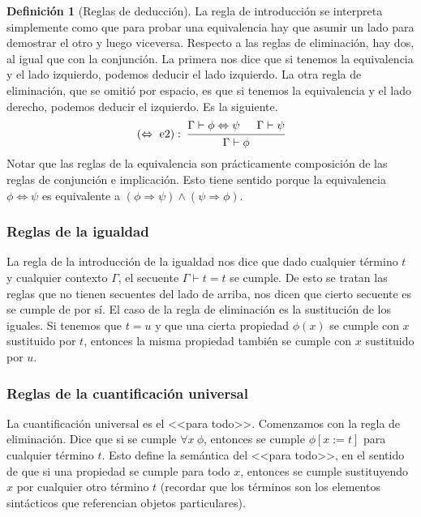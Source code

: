 \documentclass[a4paper, 12pt]{report}
\newcommand{\Ra}{\Rightarrow}
\newcommand{\te}{\text}
\newcommand{\Lra}{\Leftrightarrow}
\theoremstyle{definition}
\newtheorem{definicion}[teorema]{Definición}
\begin{document}
\begin{definicion}[Reglas de deducción]
La regla de introducción se interpreta simplemente como que para probar una equivalencia hay que asumir un lado para demostrar el otro y luego viceversa. Respecto a las reglas de eliminación, hay dos, al igual que con la conjunción. La primera nos dice que si tenemos la equivalencia y el lado izquierdo, podemos deducir el lado izquierdo. La otra regla de eliminación, que se omitió por espacio, es que si tenemos la equivalencia y el lado derecho, podemos deducir el izquierdo. Es la siguiente.
$$(\Lra\te{ e2}):~\begin{prooftree}
	\hypo{\Gamma\vdash\phi\Lra\psi}\hypo{\Gamma\vdash\psi}
	\infer2{\Gamma\vdash\phi}\end{prooftree}
$$
Notar que las reglas de la equivalencia son prácticamente composición de las reglas de conjunción e implicación. Esto tiene sentido porque la equivalencia $\phi\Lra\psi$ es equivalente a $(\phi\Ra\psi)\wedge(\psi\Ra\phi)$.

\subsubsection{Reglas de la igualdad}

La regla de la introducción de la igualdad nos dice que dado cualquier término $t$ y cualquier contexto $\Gamma$, el secuente $\Gamma\vdash t=t$ se cumple. De esto se tratan las reglas que no tienen secuentes del lado de arriba, nos dicen que cierto secuente es se cumple de por sí. El caso de la regla de eliminación es la sustitución de los iguales. Si tenemos que $t=u$ y que una cierta propiedad $\phi(x)$ se cumple con $x$ sustituido por $t$, entonces la misma propiedad también se cumple con $x$ sustituido por $u$.

\subsubsection{Reglas de la cuantificación universal}

La cuantificación universal es el <<para todo>>. Comenzamos con la regla de eliminación. Dice que si se cumple $\forall x~\phi$, entonces se cumple $\phi[x:=t]$ para cualquier término $t$. Esto define la semántica del <<para todo>>, en el sentido de que si una propiedad se cumple para todo $x$, entonces se cumple sustituyendo $x$ por cualquier otro término $t$ (recordar que los términos son los elementos sintácticos que referencian objetos particulares).


\end{definicion}
\end{document}

